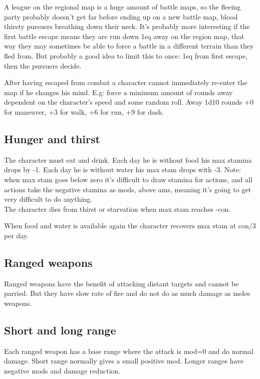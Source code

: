 A league on the regional map is a huge amount of battle maps, so the fleeing party probably doesn't get far before ending up on a new battle map, blood thirsty pursuers breathing down their neck. It's probably more interesting if the first battle escape means they are run down 1sq away on the region map, that way they may sometimes be able to force a battle in a different terrain than they fled from. But probably a good idea to limit this to once: 1sq from first escape, then the pursuers decide.

After having escaped from combat a character cannot immediately re-enter the map if he changes his mind. E.g: force a minimum amount of rounds away dependent on the character's speed and some random roll. Away 1d10 rounds +0 for maneuver, +3 for walk, +6 for run, +9 for dash.


\subsection*{Hunger and thirst}
The character must eat and drink. Each day he is without food his max stamina drops by -1. Each day he is without water his max stam drops with -3. Note: when max stam goes below zero it's difficult to draw stamina for actions, and all actions take the negative stamina as mods, above ams, meaning it's going to get very difficult to do anything.\\
The character dies from thirst or starvation when max stam reaches -con.

When food and water is available again the character recovers max stam at con/3 per day.










\subsection*{Ranged weapons}
Ranged weapons have the benefit of attacking distant targets and cannot be parried. But they have slow rate of fire and do not do as much damage as melee weapons.


\subsection*{Short and long range}
Each ranged weapon has a base range where the attack is mod=0 and do normal damage. Short range normally gives a small positive mod. Longer ranges have negative mods and damage reduction.

